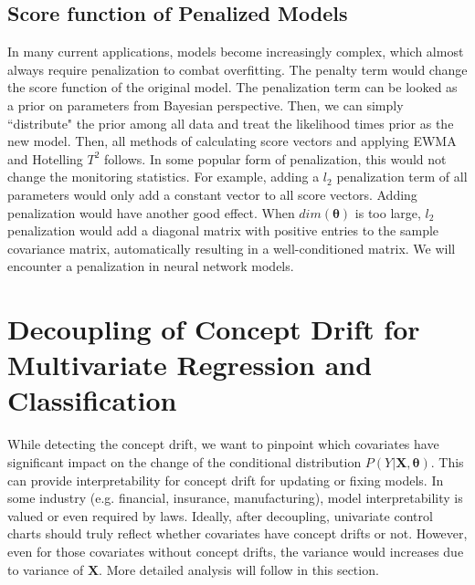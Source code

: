 \documentclass[twoside,11pt]{article}
\begin{document}
\subsection{Score function of Penalized Models}
In many current applications, models become increasingly complex, which almost always require penalization to combat overfitting. The penalty term would change the score function of the original model. The penalization term can be looked as a prior on parameters from Bayesian perspective. Then, we can simply ``distribute" the prior among all data and treat the likelihood times prior as the new model. Then, all methods of calculating score vectors and applying EWMA and Hotelling $T^2$ follows. In some popular form of penalization, this would not change the monitoring statistics. For example, adding a $l_2$ penalization term of all parameters would only add a constant vector to all score vectors. Adding penalization would have another good effect. When $dim ( \bm { \theta})$ is too large, $l_2$ penalization would add a diagonal matrix with positive entries to the sample covariance matrix, automatically resulting in a well-conditioned matrix. We will encounter a penalization in neural network models. 

\section{Decoupling of Concept Drift for Multivariate Regression and Classification}
\label{s:decou_cd}
While detecting the concept drift, we want to pinpoint which {covariates} have significant impact on the change of {the} conditional distribution {$P(Y| \bm {X}, \bm{\theta})$}. This can provide interpretability for concept drift for updating or fixing models. In some industry (e.g. financial, insurance, manufacturing), model interpretability is valued or even required by laws. Ideally, after decoupling, univariate control charts should truly reflect whether covariates have concept drifts or not. However, even for those covariates without concept drifts, the variance would increases due to variance of $\bm {X}$. More detailed analysis will follow in this section.
\end{document}
